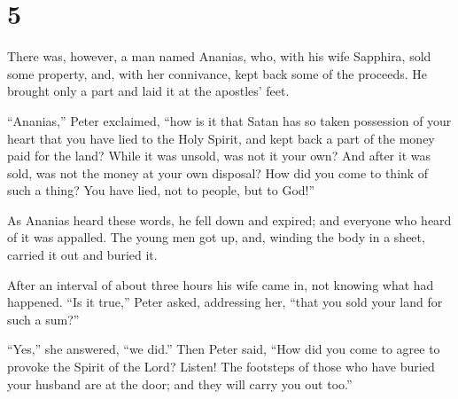 \hypertarget{section-4}{%
\section{5}\label{section-4}}

 There was, however, a man named Ananias, who, with his wife
Sapphira, sold some property,  and, with her connivance,
kept back some of the proceeds. He brought only a part and laid it at
the apostles' feet.

 ``Ananias,'' Peter exclaimed, ``how is it that Satan has so
taken possession of your heart that you have lied to the Holy Spirit,
and kept back a part of the money paid for the land?  While
it was unsold, was not it your own? And after it was sold, was not the
money at your own disposal? How did you come to think of such a thing?
You have lied, not to people, but to God!''

 As Ananias heard these words, he fell down and expired; and
everyone who heard of it was appalled.  The young men got
up, and, winding the body in a sheet, carried it out and buried it.

 After an interval of about three hours his wife came in,
not knowing what had happened.  ``Is it true,'' Peter asked,
addressing her, ``that you sold your land for such a sum?''

``Yes,'' she answered, ``we did.''  Then Peter said, ``How
did you come to agree to provoke the Spirit of the Lord? Listen! The
footsteps of those who have buried your husband are at the door; and
they will carry you out too.''

